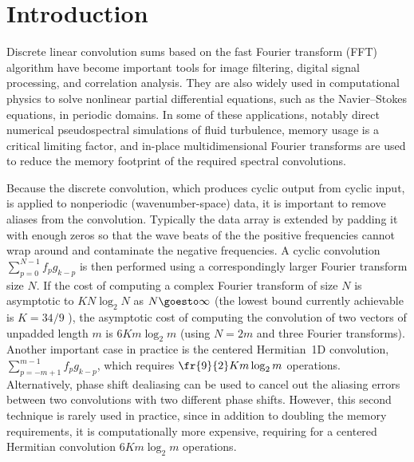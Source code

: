 \documentclass[final]{siamltex}
\begin{document}



\section{Introduction}
Discrete linear convolution sums based on the fast Fourier transform
(FFT) algorithm \cite{Gauss1866,Cooley65} have become important tools
for image filtering, digital signal processing, and correlation
analysis. They are also widely used in computational physics to solve
nonlinear partial differential equations, such as the Navier--Stokes
equations, in periodic domains. In some of these applications, notably
direct numerical pseudospectral simulations of fluid turbulence,
memory usage is a critical limiting factor, and in-place
multidimensional Fourier transforms are used to reduce the memory
footprint of the required spectral convolutions.

Because the discrete convolution, which produces cyclic output from cyclic
input, is applied to nonperiodic (wavenumber-space) data, it is important
to remove aliases from the convolution. Typically the data array is
extended by padding it with enough zeros so that the wave beats of the
the positive frequencies cannot wrap around and contaminate
the negative frequencies. A cyclic convolution $\sum_{p=0}^{N-1} f_p g_{k-p}$ is then performed using a
correspondingly larger Fourier transform size $N$. If the cost of 
computing a complex Fourier transform of size $N$ is asymptotic to 
$K N\log_2 N$ as \hbox{$N\goesto\infty$} (the lowest bound currently 
achievable is $K=34/9$ \cite{Johnson07,Lundy07}), the asymptotic cost of
computing the convolution of two vectors of unpadded length $m$ is
$6Km\log_2 m$ (using $N=2m$ and three Fourier transforms).
Another important case in practice is the centered Hermitian~1D convolution,
$\sum_{p=-m+1}^{m-1} f_p g_{k-p}$, which requires $\fr{9}{2}Km\log_2 m$
operations.
Alternatively, phase shift dealiasing \cite{Patterson71,Canuto} can be used
to cancel out the aliasing errors between two convolutions with two
different phase shifts. However, this second technique is rarely used in
practice, since in addition to doubling the memory requirements, it is
computationally more expensive, requiring for a centered Hermitian convolution
$6K m\log_2 m$ operations.
\end{document}
